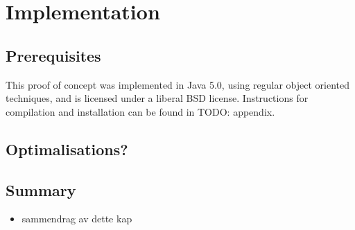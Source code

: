 \chapter{Implementation}
\label{chapter:implementation}
\section{Prerequisites}
This proof of concept was implemented in Java 5.0, using regular object
oriented techniques, and is licensed under a liberal BSD license. Instructions
for compilation and installation can be found in TODO: appendix.









\section{Optimalisations?}

\section{Summary}
\label{sect:impl:summary}
\begin{itemize}
  \item sammendrag av dette kap
\end{itemize}